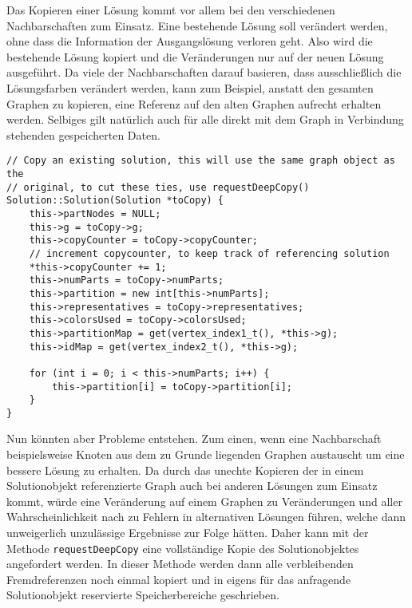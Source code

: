Das Kopieren einer Lösung kommt vor allem bei den verschiedenen Nachbarschaften zum Einsatz. Eine bestehende Lösung soll verändert werden, ohne dass die Information der Ausgangslösung verloren geht. Also wird
die bestehende Lösung kopiert und die Veränderungen nur auf der neuen Lösung ausgeführt. Da viele der Nachbarschaften darauf basieren, dass ausschließlich die Lösungsfarben verändert werden, kann zum Beispiel, 
anstatt den gesamten Graphen zu kopieren, eine Referenz auf den alten Graphen aufrecht erhalten werden. Selbiges gilt natürlich auch für alle direkt mit dem Graph in Verbindung stehenden gespeicherten Daten.

\singlespacing
\begin{lstlisting}[caption={Der Kopierkonstruktor der Solutionklasse},label={lst:copy}]
// Copy an existing solution, this will use the same graph object as the 
// original, to cut these ties, use requestDeepCopy()
Solution::Solution(Solution *toCopy) {
	this->partNodes = NULL;
	this->g = toCopy->g;
	this->copyCounter = toCopy->copyCounter;
	// increment copycounter, to keep track of referencing solution
	*this->copyCounter += 1;
	this->numParts = toCopy->numParts;
	this->partition = new int[this->numParts];
	this->representatives = toCopy->representatives;
	this->colorsUsed = toCopy->colorsUsed;
	this->partitionMap = get(vertex_index1_t(), *this->g);
	this->idMap = get(vertex_index2_t(), *this->g);

	for (int i = 0; i < this->numParts; i++) {
		this->partition[i] = toCopy->partition[i];
	}
}
\end{lstlisting}

Nun könnten aber Probleme entstehen. Zum einen, wenn eine Nachbarschaft beispielsweise Knoten aus dem zu Grunde liegenden Graphen austauscht um eine bessere Lösung zu erhalten. Da durch das unechte Kopieren
der in einem Solutionobjekt referenzierte Graph auch bei anderen Lösungen zum Einsatz kommt, würde eine Veränderung auf einem Graphen zu Veränderungen und aller Wahrscheinlichkeit nach zu Fehlern in alternativen
Lösungen führen, welche dann unweigerlich unzulässige Ergebnisse zur Folge hätten. Daher kann mit der Methode \texttt{requestDeepCopy} eine vollständige Kopie des Solutionobjektes angefordert werden. In dieser
Methode werden dann alle verbleibenden Fremdreferenzen noch einmal kopiert und in eigens für das anfragende Solutionobjekt reservierte Speicherbereiche geschrieben.

